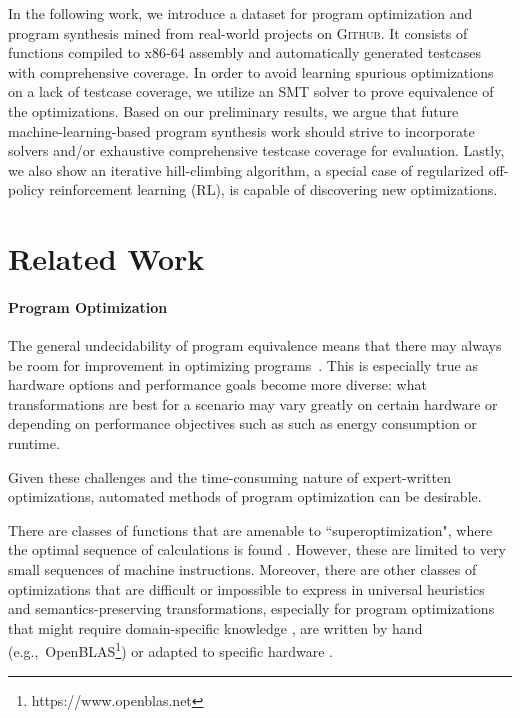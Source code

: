 \documentclass{article}
\begin{document}
In the following work, we introduce a dataset for program optimization and program synthesis mined from real-world projects on \textsc{Github}. It consists of functions compiled to x86-64 assembly and automatically generated testcases with comprehensive coverage. In order to avoid learning spurious optimizations on a lack of testcase coverage, we utilize an SMT solver to prove equivalence of the optimizations. Based on our preliminary results, we argue that future machine-learning-based program synthesis work should strive to incorporate solvers and/or exhaustive comprehensive testcase coverage for evaluation. Lastly, we also show an iterative hill-climbing algorithm, a special case of  regularized off-policy reinforcement learning (RL), is capable of discovering new optimizations.  

\section{Related Work}

\paragraph{Program Optimization}

The general undecidability of program equivalence means that there may always be room for improvement in optimizing programs~\citep{rice1953}. This is especially true as hardware options and performance goals become more diverse: what transformations are best for a scenario may vary greatly on certain hardware or depending on performance objectives such as such as energy consumption or runtime.   

Given these challenges and the time-consuming nature of expert-written optimizations, automated methods of program optimization can be desirable.

There are classes of functions that are amenable to ``superoptimization", where the optimal sequence of calculations is found \citep{massalin1987superoptimizer}. However, these are limited to very small sequences of machine instructions. Moreover, there are other classes of optimizations that are difficult or impossible to express in universal heuristics and semantics-preserving transformations, especially for program optimizations that might require domain-specific knowledge \citep{rinard2006}, are written by hand (e.g.,~OpenBLAS\footnote{https://www.openblas.net}) or adapted to specific hardware \citep{fftw}.
\end{document}
